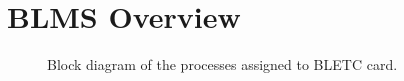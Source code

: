 \documentclass{llncs}
\begin{document}





\section{BLMS Overview}
\label{sec-BLM}


\begin{figure}[t]
  \centering  {}
   \caption{Block diagram of the processes assigned to BLETC card.}
  \label{fig:BLETC}
\end{figure}
\end{document}
